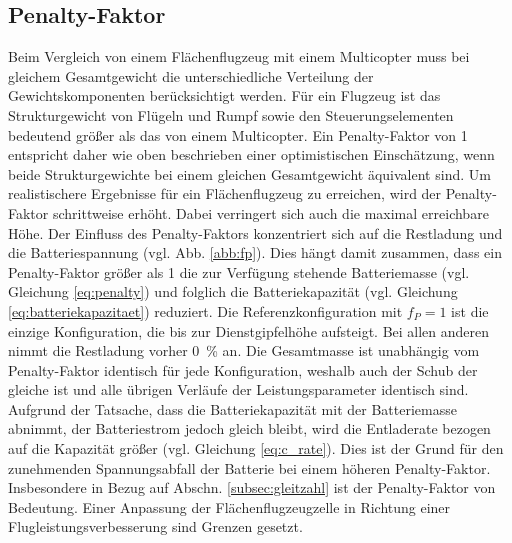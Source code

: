 \subsection{Penalty-Faktor}
\label{subsec:f_p}
Beim Vergleich von einem Flächenflugzeug mit einem Multicopter muss bei gleichem Gesamtgewicht die unterschiedliche Verteilung der Gewichtskomponenten berücksichtigt werden. Für ein Flugzeug ist das Strukturgewicht von Flügeln und Rumpf sowie den Steuerungselementen bedeutend größer als das von einem Multicopter. Ein Penalty-Faktor von 1 entspricht daher wie oben beschrieben einer optimistischen Einschätzung, wenn beide Strukturgewichte bei einem gleichen Gesamtgewicht äquivalent sind. Um realistischere Ergebnisse für ein Flächenflugzeug zu erreichen, wird der Penalty-Faktor schrittweise erhöht. Dabei verringert sich auch die maximal erreichbare Höhe.
Der Einfluss des Penalty-Faktors konzentriert sich auf die Restladung und die Batteriespannung (vgl. Abb. \ref{abb:fp}). Dies hängt damit zusammen, dass ein Penalty-Faktor größer als 1 die zur Verfügung stehende Batteriemasse (vgl. Gleichung \eqref{eq:penalty}) und folglich die Batteriekapazität (vgl. Gleichung \eqref{eq:batteriekapazitaet}) reduziert. Die Referenzkonfiguration mit \ensuremath{f_P = 1} ist die einzige Konfiguration, die bis zur Dienstgipfelhöhe aufsteigt. Bei allen anderen nimmt die Restladung vorher \SI{0}{\%} an. Die Gesamtmasse ist unabhängig vom Penalty-Faktor identisch für jede Konfiguration, weshalb auch der Schub der gleiche ist und alle übrigen Verläufe der Leistungsparameter identisch sind. 
Aufgrund der Tatsache, dass die Batteriekapazität mit der Batteriemasse abnimmt, der Batteriestrom jedoch gleich bleibt, wird die Entladerate bezogen auf die Kapazität größer (vgl. Gleichung \eqref{eq:c_rate}). Dies ist der Grund für den zunehmenden Spannungsabfall der Batterie bei einem höheren Penalty-Faktor.\\
Insbesondere in Bezug auf Abschn. \ref{subsec:gleitzahl} ist der Penalty-Faktor von Bedeutung. Einer Anpassung der Flächenflugzeugzelle in Richtung einer Flugleistungsverbesserung sind Grenzen gesetzt. 


